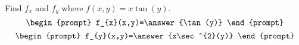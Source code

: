 \documentclass{ximera}
\author{David Guichard \and Neal Koblitz \and H. Jerome Keisler \and Albert Scheller \and Barry Balof \and Mike Wills \and Matthew Carr}
\begin{document}
\begin{exercise}




Find $f_x$ and $f_y$ where $f(x,y)=x\tan(y)$.
\[
\begin{prompt}
f_{x}(x,y)=\answer{\tan(y)}
\end{prompt}
\]
\[
\begin{prompt}
f_{y}(x,y)=\answer{x\sec^{2}(y)}
\end{prompt}
\]

\end{exercise}
\end{document}
